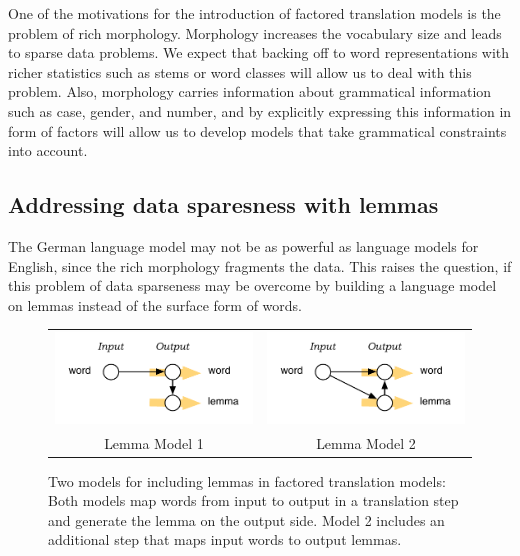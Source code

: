 \documentclass[11pt]{report}
\theoremstyle{plain}
\begin{document}
{One of the motivations for the introduction of factored translation models is the problem of rich morphology. Morphology increases the vocabulary size and leads to sparse data problems. We expect that backing off to word representations with richer statistics such as stems or word classes will allow us to deal with this problem. Also, morphology carries information about grammatical information such as case, gender, and number, and by explicitly expressing this information in form of factors will allow us to develop models that take grammatical constraints into account.

\subsection{Addressing data sparesness with lemmas}
The German language model may not be as powerful as language models for English, since the rich morphology fragments the data. This raises the question, if this problem of data sparseness may be overcome by building a language model on lemmas instead of the surface form of words.

\begin{figure}
\begin{center}
\begin{tabular}{cc}
\includegraphics[scale=1]{factored-lemma2.pdf}
&
\includegraphics[scale=1]{factored-lemma1.pdf}
\\
Lemma Model 1 & Lemma Model 2
\end{tabular}
\end{center}
\caption{Two models for including lemmas in factored translation models: Both models map words from input to output in a translation step and generate the lemma on the output side. Model 2 includes an additional step that maps input words to output lemmas.}
\label{fig:german:lemma-model}
\end{figure}

}
\end{document}
